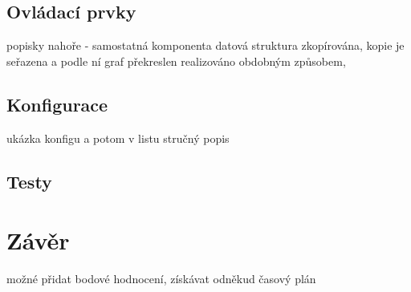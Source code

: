 \documentclass[
  digital, %
  oneside, %
  table,   %
  nolof,     %
  nolot,     %
]{fithesis3}
\begin{document}
\section{Ovládací prvky}
popisky nahoře - samostatná komponenta
datová struktura zkopírována, kopie je seřazena a podle ní graf překreslen
realizováno obdobným způsobem, 

\section{Konfigurace}
ukázka konfigu a potom v listu stručný popis

\section{Testy}

\chapter{Závěr}
možné přidat bodové hodnocení, získávat odněkud časový plán

\printbibliography
\end{document}
